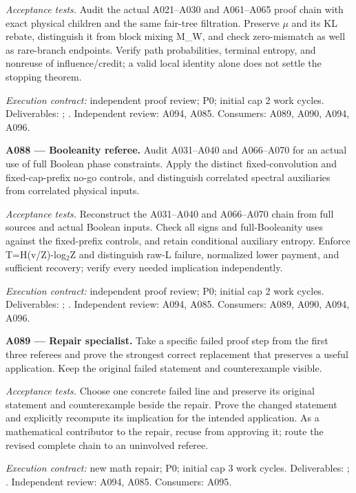 \documentclass[11pt]{article}
\begin{document}
\emph{Acceptance tests.} Audit the actual A021--A030 and A061--A065 proof chain with exact physical children and the same fair-tree filtration. Preserve $\mu$ and its KL rebate, distinguish it from block mixing M\_W, and check zero-mismatch as well as rare-branch endpoints. Verify path probabilities, terminal entropy, and nonreuse of influence/credit; a valid local identity alone does not settle the stopping theorem.

{\small\emph{Execution contract:} independent proof review; P0; initial cap 2 work cycles. Deliverables: ; . Independent review: A094, A085. Consumers: A089, A090, A094, A096.}

\textbf{A088 --- Booleanity referee.} Audit A031--A040 and A066--A070 for an actual use of full Boolean phase constraints. Apply the distinct fixed-convolution and fixed-cap-prefix no-go controls, and distinguish correlated spectral auxiliaries from correlated physical inputs.

\emph{Acceptance tests.} Reconstruct the A031--A040 and A066--A070 chain from full sources and actual Boolean inputs. Check all signs and full-Booleanity uses against the fixed-prefix controls, and retain conditional auxiliary entropy. Enforce T=H(v/Z)-log$_2$Z and distinguish raw-L failure, normalized lower payment, and sufficient recovery; verify every needed implication independently.

{\small\emph{Execution contract:} independent proof review; P0; initial cap 2 work cycles. Deliverables: ; . Independent review: A094, A085. Consumers: A089, A090, A094, A096.}

\textbf{A089 --- Repair specialist.} Take a specific failed proof step from the first three referees and prove the strongest correct replacement that preserves a useful application. Keep the original failed statement and counterexample visible.

\emph{Acceptance tests.} Choose one concrete failed line and preserve its original statement and counterexample beside the repair. Prove the changed statement and explicitly recompute its implication for the intended application. As a mathematical contributor to the repair, recuse from approving it; route the revised complete chain to an uninvolved referee.

{\small\emph{Execution contract:} new math repair; P0; initial cap 3 work cycles. Deliverables: ; . Independent review: A094, A085. Consumers: A095.}
\end{document}

